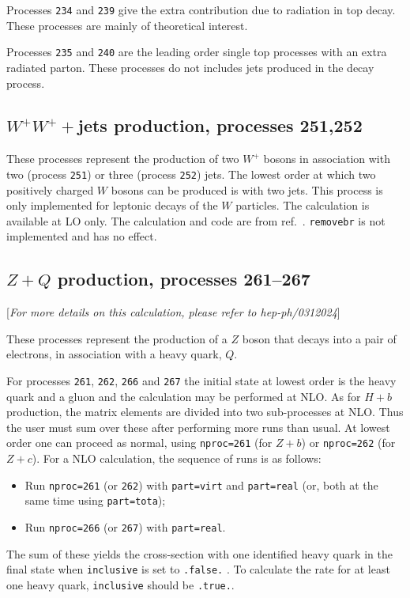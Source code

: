 \documentclass[12pt]{article}
\begin{document}
Processes {\tt 234} and {\tt 239} give the extra contribution due to radiation 
in top decay. These processes are mainly of theoretical interest. 

Processes {\tt 235} and {\tt 240} are the leading order single top processes with an 
extra radiated parton. These processes do not includes jets produced in the decay process.

\subsection{$W^+W^++$jets production, processes 251,252}
These processes represent the production of two $W^+$ 
bosons in association with two (process {\tt 251}) or three (process {\tt 252})
jets.  The lowest order at which two positively charged $W$ bosons 
can be produced is with two jets. 
This process is only implemented for leptonic decays of the 
$W$ particles. The calculation is available at LO only.
The calculation and code are from ref.~\cite{Melia:2010bm}.
{\tt removebr} is not implemented and has no effect.

\subsection{$Z+Q$ production, processes 261--267}
\label{subsec:ZQ}

\begin{center}
[{\it For more details on this calculation, please refer to hep-ph/0312024}]
\end{center}

These processes represent the production of a $Z$
boson that decays into a pair of electrons,
in association with a heavy quark, $Q$.

For processes {\tt 261}, {\tt 262}, {\tt 266} and {\tt 267} the initial
state at lowest order is the heavy quark and a gluon and 
the calculation may be performed at NLO.
As for $H+b$ production, the matrix elements are divided into two
sub-processes at NLO. Thus the user must sum over these after performing
more runs than usual. At lowest order one can proceed as normal, using
{\tt nproc=261} (for $Z+b$) or {\tt nproc=262} (for $Z+c$).
For a NLO calculation, the sequence of runs is as follows:
\begin{itemize}
\item Run {\tt nproc=261} (or {\tt 262}) with {\tt part=virt} and
{\tt part=real} (or, both at the same time using {\tt part=tota});
\item Run {\tt nproc=266} (or {\tt 267}) with {\tt part=real}.
\end{itemize}
The sum of these yields the cross-section with one identified heavy quark in
the final state when {\tt inclusive} is set to {\tt .false.} . To calculate the
rate for at least one heavy quark, {\tt inclusive} should be {\tt .true.}.
\end{document}
